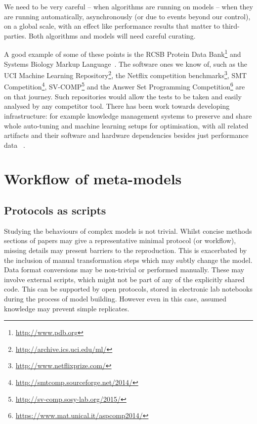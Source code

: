 \documentclass[conference]{IEEEtran}
\begin{document}
We need to be very careful -- when algorithms are running on models -- when
they are running automatically, asynchronously (or due to events beyond our
control), on a global scale, with an effect like performance results that
matter to third-parties. Both algorithms and  models will need careful
curating.

A good example of some of these points is the RCSB Protein Data
Bank\footnote{\url{http://www.pdb.org}} and Systems Biology Markup
Language~\cite{Hucka2003,Chaouiya2013}. The software ones we know of,
such as the UCI Machine Learning
Repository\footnote{\url{http://archive.ics.uci.edu/ml/}}, 
the Netflix competition benchmarks\footnote{\url{http://www.netflixprize.com/}}, 
SMT Competition\footnote{\url{http://smtcomp.sourceforge.net/2014/}},
SV-COMP\footnote{\url{http://sv-comp.sosy-lab.org/2015/}} and the
Answer Set Programming
Competition\footnote{\url{https://www.mat.unical.it/aspcomp2014/}} are
on that journey. Such repositories would allow the tests to be taken
and easily analysed by any competitor tool. There has been work
towards developing infrastructure: for example knowledge management
systems to preserve and share whole auto-tuning and machine learning
setups for optimisation, with all related artifacts and their software
and hardware dependencies besides just performance data
~\cite{fursin-et-al:2014}.






\section{Workflow of meta-models}

\subsection{Protocols as scripts}

Studying the behaviours of complex models is not trivial. Whilst 
concise methods sections of papers may give a representative minimal
protocol (or workflow), missing details may present barriers to 
the reproduction. This is exacerbated by the inclusion of manual 
transformation steps which may subtly change the model. Data format 
conversions may be non-trivial or performed manually. These may 
involve external scripts, which might not be part of any of the
explicitly shared code. This can be supported by open protocols, stored 
in electronic lab notebooks during the process of model building. However
even in this case, assumed knowledge may prevent simple replicates.
\end{document}
